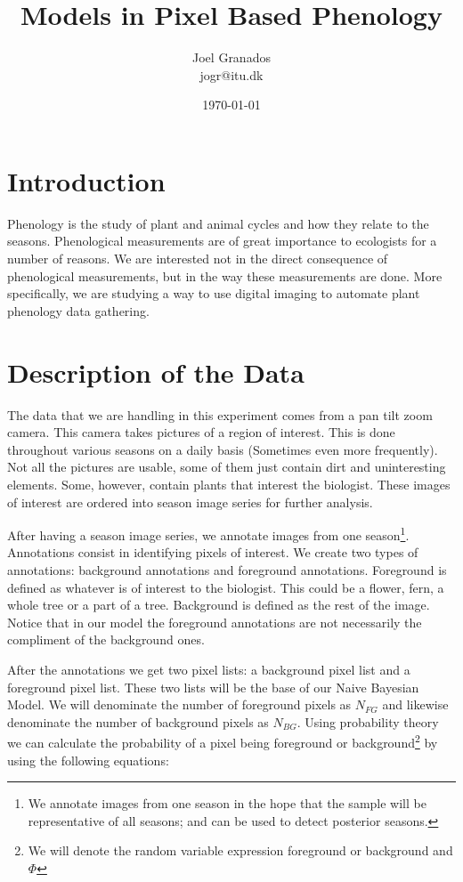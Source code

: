 \documentclass[a4paper,12pt]{report}
\begin{document}
\title{Models in Pixel Based Phenology}
\author{Joel Granados \\ jogr@itu.dk}
\date{ \today }

\maketitle

\section*{Introduction}
Phenology is the study of plant and animal cycles and how they relate to the
seasons. Phenological measurements are of great importance to ecologists for a
number of reasons. We are interested not in the direct consequence of
phenological measurements, but in the way these measurements are done. More
specifically, we are studying a way to use digital imaging to automate plant
phenology data gathering.

\section{Description of the Data}
The data that we are handling in this experiment comes from a pan tilt zoom
camera. This camera takes pictures of a region of interest. This is done
throughout various seasons on a daily basis (Sometimes even more frequently).
Not all the pictures are usable, some of them just contain dirt and
uninteresting elements. Some, however, contain plants that interest the
biologist. These images of interest are ordered into season image series for
further analysis.

After having a season image series, we annotate images from one
season\footnote{We annotate images from one season in the hope that the
sample will be representative of all seasons; and can be used to detect
posterior seasons.}. Annotations consist in identifying pixels of interest.
We create two types of annotations: background annotations and foreground
annotations. Foreground is defined as whatever is of interest to
the biologist. This could be a flower, fern, a whole tree or a part of a tree.
Background is defined as the rest of the image. Notice that in our model the
foreground annotations are not necessarily the compliment of the background
ones.

After the annotations we get two pixel lists: a background pixel list and a
foreground pixel list. These two lists will be the base of our Naive Bayesian
Model. We will denominate the number of foreground pixels as $N_{FG}$ and
likewise denominate the number of background pixels as $N_{BG}$. Using probability
theory  we can calculate
the probability of a pixel being foreground or background\footnote{We will
denote the random variable expression foreground or background and $\Phi$}
by using the following equations:
\end{document}
